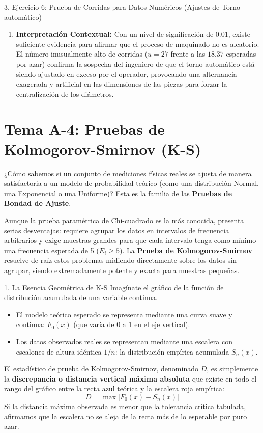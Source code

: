 \documentclass[11pt,a4paper]{article}
\begin{document}
\begin{subsection}{3. Ejercicio 6: Prueba de Corridas para Datos Numéricos (Ajustes de Torno automático)}
\begin{enumerate}
        \item \textbf{Interpretación Contextual:}
              Con un nivel de significación de $0.01$, existe suficiente evidencia para afirmar que el proceso de maquinado no es aleatorio. El número inusualmente alto de corridas ($u=27$ frente a las $18.37$ esperadas por azar) confirma la sospecha del ingeniero de que el torno automático está siendo ajustado en exceso por el operador, provocando una alternancia exagerada y artificial en las dimensiones de las piezas para forzar la centralización de los diámetros.
    \end{enumerate}
\end{subsection}

\newpage
\section{Tema A-4: Pruebas de Kolmogorov-Smirnov (K-S)}

¿Cómo sabemos si un conjunto de mediciones físicas reales se ajusta de manera satisfactoria a un modelo de probabilidad teórico (como una distribución Normal, una Exponencial o una Uniforme)? Esta es la familia de las \textbf{Pruebas de Bondad de Ajuste}. 

Aunque la prueba paramétrica de Chi-cuadrado es la más conocida, presenta serias desventajas: requiere agrupar los datos en intervalos de frecuencia arbitrarios y exige muestras grandes para que cada intervalo tenga como mínimo una frecuencia esperada de 5 ($E_i \ge 5$). La \textbf{Prueba de Kolmogorov-Smirnov} resuelve de raíz estos problemas midiendo directamente sobre los datos sin agrupar, siendo extremadamente potente y exacta para muestras pequeñas.

\begin{subsection}{1. La Esencia Geométrica de K-S}
    Imagínate el gráfico de la función de distribución acumulada de una variable continua. 
    \begin{itemize}
        \item El modelo teórico esperado se representa mediante una curva suave y continua: $F_0(x)$ (que varía de 0 a 1 en el eje vertical).
        \item Los datos observados reales se representan mediante una escalera con escalones de altura idéntica $1/n$: la distribución empírica acumulada $S_n(x)$.
    \end{itemize}
    El estadístico de prueba de Kolmogorov-Smirnov, denominado \textbf{$D$}, es simplemente la \textbf{discrepancia o distancia vertical máxima absoluta} que existe en todo el rango del gráfico entre la recta azul teórica y la escalera roja empírica:
    \[ D = \max |F_0(x) - S_n(x)| \]
    Si la distancia máxima observada es menor que la tolerancia crítica tabulada, afirmamos que la escalera no se aleja de la recta más de lo esperable por puro azar.
\end{subsection}
\end{document}
